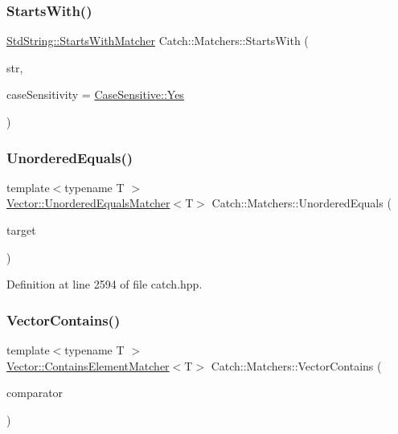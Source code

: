 \subsubsection{\texorpdfstring{Starts\+With()}{StartsWith()}}
{\footnotesize\ttfamily \mbox{\hyperlink{struct_catch_1_1_matchers_1_1_std_string_1_1_starts_with_matcher}{Std\+String\+::\+Starts\+With\+Matcher}} Catch\+::\+Matchers\+::\+Starts\+With (\begin{DoxyParamCaption}\item[{std\+::string const \&}]{str,  }\item[{\mbox{\hyperlink{struct_catch_1_1_case_sensitive_aad49d3aee2d97066642fffa919685c6a}{Case\+Sensitive\+::\+Choice}}}]{case\+Sensitivity = {\ttfamily \mbox{\hyperlink{struct_catch_1_1_case_sensitive_aad49d3aee2d97066642fffa919685c6aa7c5550b69ec3c502e6f609b67f9613c6}{Case\+Sensitive\+::\+Yes}}} }\end{DoxyParamCaption})}

\mbox{\label{namespace_catch_1_1_matchers_a3eced3a4f580478f4c5e67ed7e2915df}} 
\subsubsection{\texorpdfstring{Unordered\+Equals()}{UnorderedEquals()}}
{\footnotesize\ttfamily template$<$typename T $>$ \\
\mbox{\hyperlink{struct_catch_1_1_matchers_1_1_vector_1_1_unordered_equals_matcher}{Vector\+::\+Unordered\+Equals\+Matcher}}$<$T$>$ Catch\+::\+Matchers\+::\+Unordered\+Equals (\begin{DoxyParamCaption}\item[{std\+::vector$<$ T $>$ const \&}]{target }\end{DoxyParamCaption})}



Definition at line 2594 of file catch.\+hpp.

\mbox{\label{namespace_catch_1_1_matchers_ae8db5846328116fb36386893deaec944}} 
\subsubsection{\texorpdfstring{Vector\+Contains()}{VectorContains()}}
{\footnotesize\ttfamily template$<$typename T $>$ \\
\mbox{\hyperlink{struct_catch_1_1_matchers_1_1_vector_1_1_contains_element_matcher}{Vector\+::\+Contains\+Element\+Matcher}}$<$T$>$ Catch\+::\+Matchers\+::\+Vector\+Contains (\begin{DoxyParamCaption}\item[{T const \&}]{comparator }\end{DoxyParamCaption})}



